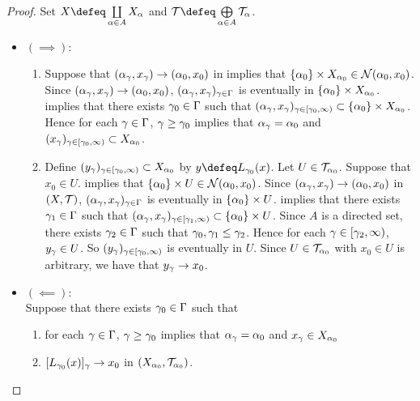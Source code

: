 \documentclass{book}
\begin{document}
	\begin{proof}
		Set $X \defeq \coprod\limits_{\al \in A} X_{\al}$ and $\MT \defeq \bigoplus\limits_{\al \in A} \MT_{\al}$.
		\begin{itemize}
			\item $(\implies):$ \\
			\begin{enumerate}
				\item Suppose that $(\alpha_{\gamma}, x_{\gamma}) \rightarrow (\alpha_0, x_0)$ in  implies that $\{\alpha_0\} \times X_{\alpha_0} \in \mathcal{N}(\alpha_0, x_0)$. Since $(\alpha_{\gamma}, x_{\gamma}) \rightarrow (\alpha_0, x_0)$, $(\alpha_{\gamma}, x_{\gamma})_{\gamma \in \Gamma}$ is eventually in $\{\alpha_0\} \times X_{\alpha_0}$.  implies that there exists $\gamma_0 \in \Gamma$ such that $(\alpha_{\gamma}, x_{\gamma})_{\gamma \in [\gamma_0, \infty)}  \subset \{\alpha_0\} \times X_{\alpha_0}$. Hence for each $\gamma \in \Gamma$, $\gamma \geq \gamma_0$ implies that $\alpha_{\gamma} = \alpha_0$ and $(x_{\gamma})_{\gamma \in [\gamma_0, \infty)} \subset X_{\alpha_0}$.
				\item Define $(y_{\gamma})_{\gamma \in [\gamma_0, \infty)} \subset X_{\alpha_0}$ by $y \defeq L_{\gam_0}(x)$.   Let $U \in \mathcal{T}_{\alpha_0}$. Suppose that $x_0 \in U$.  implies that $\{\alpha_0\} \times U \in \mathcal{N}(\alpha_0, x_0)$. Since $(\alpha_{\gamma}, x_{\gamma}) \rightarrow (\alpha_0, x_0)$ in $(X, \mathcal{T})$, $(\alpha_{\gamma}, x_{\gamma})_{\gamma \in \Gamma}$ is eventually in $\{\alpha_0\} \times U$.  implies that there exists $\gamma_1 \in \Gamma$ such that $(\alpha_{\gamma}, x_{\gamma})_{\gamma \in [\gamma_1, \infty)}  \subset \{\alpha_0\} \times U$. Since $A$ is a directed set, there exists $\gamma_2 \in \Gamma$ such that $\gamma_0, \gamma_1 \leq \gamma_2$. Hence for each $\gamma \in [\gamma_2, \infty)$, $y_{\gamma} \in U$. So $(y_{\gamma})_{\gamma \in [\gamma_0, \infty)}$ is eventually in $U$. Since $U \in \mathcal{T}_{\alpha_0}$ with $x_0 \in U$ is arbitrary, we have that $y_{\gamma} \rightarrow x_0$. 
			\end{enumerate}
			\item $(\impliedby):$ \\
			Suppose that there exists $\gamma_0 \in \Gamma$ such that
			\begin{enumerate}
				\item for each $\gamma \in \Gamma$, $\gamma \geq \gamma_0$ implies that $\alpha_{\gamma} = \alpha_0$ and $x_{\gamma} \in X_{\alpha_0}$
				\item $[L_{\gamma_0}(x)]_{\gamma} \rightarrow x_0$ in $(X_{\alpha_0}, \mathcal{T}_{\alpha_0})$.
			\end{enumerate}

\end{itemize}
\end{proof}
\end{document}
